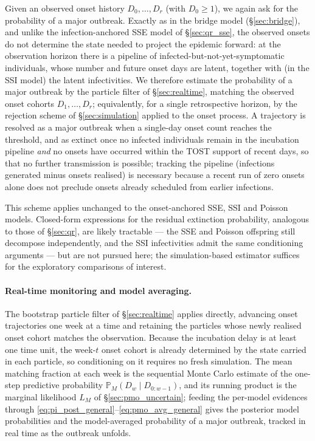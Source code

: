 \documentclass{article}
\theoremstyle{definition}
\begin{document}
Given an observed onset history $D_0, \ldots, D_r$ (with $D_0 \geq 1$), we again
ask for the probability of a major outbreak.  Exactly as in the bridge model
(\S\ref{sec:bridge}), and unlike the infection-anchored SSE model of
\S\ref{sec:qr_sse}, the observed onsets do not determine the state needed to
project the epidemic forward: at the observation horizon there is a pipeline of
infected-but-not-yet-symptomatic individuals, whose number and future onset days
are latent, together with (in the SSI model) the latent infectivities.  We
therefore estimate the probability of a major outbreak by the particle filter of
\S\ref{sec:realtime}, matching the observed onset cohorts $D_1, \ldots, D_r$;
equivalently, for a single retrospective horizon, by the rejection scheme of
\S\ref{sec:simulation} applied to the onset process.  A trajectory is resolved as
a major outbreak when a single-day onset count reaches the threshold, and as
extinct once no infected individuals remain in the incubation pipeline
\emph{and} no onsets have occurred within the TOST support of recent days, so
that no further transmission is possible; tracking the pipeline (infections
generated minus onsets realised) is necessary because a recent run of zero onsets
alone does not preclude onsets already scheduled from earlier infections.

This scheme applies unchanged to the onset-anchored SSE, SSI and Poisson models.
Closed-form expressions for the residual extinction probability, analogous to
those of \S\ref{sec:qr}, are likely tractable --- the SSE and Poisson offspring
still decompose independently, and the SSI infectivities admit the same
conditioning arguments --- but are not pursued here; the simulation-based
estimator suffices for the exploratory comparisons of interest.

\paragraph{Real-time monitoring and model averaging.}
The bootstrap particle filter of \S\ref{sec:realtime} applies directly, advancing
onset trajectories one week at a time and retaining the particles whose newly
realised onset cohort matches the observation.  Because the incubation delay is
at least one time unit, the week-$t$ onset cohort is already determined by the
state carried in each particle, so conditioning on it requires no fresh
simulation.  The mean matching fraction at each week is the sequential Monte
Carlo estimate of the one-step predictive probability
$\mathbb{P}_M(D_w \mid D_{0:w-1})$, and its running product is the marginal
likelihood $L_M$ of \S\ref{sec:pmo_uncertain}; feeding the per-model evidences
through \eqref{eq:pi_post_general}--\eqref{eq:pmo_avg_general} gives the posterior
model probabilities and the model-averaged probability of a major outbreak,
tracked in real time as the outbreak unfolds.
\end{document}
